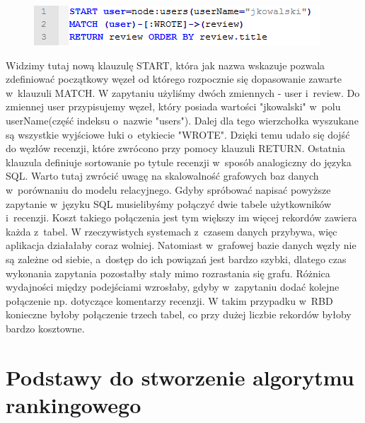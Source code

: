 \begin{figure}[H]
	\centering
	\includegraphics{images/cypher_q2.png}
\end{figure}

Widzimy tutaj nową klauzulę START, która jak nazwa wskazuje pozwala zdefiniować początkowy węzeł od którego rozpocznie się dopasowanie zawarte w~klauzuli MATCH. W zapytaniu użyliśmy dwóch zmiennych - user i~review. Do zmiennej user przypisujemy węzeł, który posiada wartości "jkowalski" w~polu userName(część indeksu o~nazwie "users"). Dalej dla tego wierzchołka wyszukane są wszystkie wyjściowe łuki o~etykiecie "WROTE". Dzięki temu udało się dojść do węzłów recenzji, które zwrócono przy pomocy klauzuli RETURN. Ostatnia klauzula definiuje sortowanie po tytule recenzji w~sposób analogiczny do języka SQL. Warto tutaj zwrócić uwagę na skalowalność grafowych baz danych w~porównaniu do modelu relacyjnego. Gdyby spróbować napisać powyższe zapytanie w~języku SQL musielibyśmy połączyć dwie tabele użytkowników i~recenzji. Koszt takiego połączenia jest tym większy im więcej rekordów zawiera każda z~tabel. W rzeczywistych systemach z~czasem danych przybywa, więc aplikacja działałaby coraz wolniej. Natomiast w~grafowej bazie danych węzły nie są zależne od siebie, a~dostęp do ich powiązań jest bardzo szybki, dlatego czas wykonania zapytania pozostałby stały mimo rozrastania się grafu. Różnica wydajności między podejściami wzrosłaby, gdyby w~zapytaniu dodać kolejne połączenie np. dotyczące komentarzy recenzji. W takim przypadku w~RBD konieczne byłoby połączenie trzech tabel, co przy dużej liczbie rekordów byłoby bardzo kosztowne.


\section{Podstawy do stworzenie algorytmu rankingowego}
\label{sec:algTeotia}

